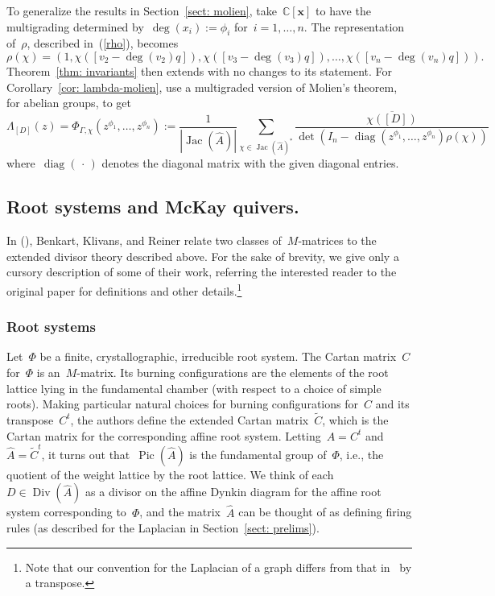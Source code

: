 \documentclass{amsart}
\DeclareMathOperator{\Pic}{Pic}
\DeclareMathOperator{\Jac}{Jac}
\DeclareMathOperator{\Div}{Div}
\DeclareMathOperator{\diag}{diag}
\newcommand{\C}{\mathbb{C}}
\newcommand{\wA}{\widehat{A}}
\newcommand{\polyring}{\C[\mathbf{x}]}
\begin{document}
  To generalize the results in
Section~\ref{sect: molien}, take~$\polyring$ to have the multigrading determined
by~$\deg(x_i):=\phi_i$ for~$i=1,\dots,n$.  The representation of~$\rho$, described
in~(\ref{rho}), becomes
\begin{equation}\label{eqn: new rho}
  \rho(\chi)=(1,\chi([v_2-\deg(v_2)q]),\chi([v_3-\deg(v_3)q]),\dots,\chi([v_n-\deg(v_n)q])).
\end{equation}
Theorem~\ref{thm: invariants} then extends with no changes to its statement.  For
Corollary~\ref{cor: lambda-molien}, use a multigraded version of Molien's theorem,
for abelian groups, to get
\begin{equation}\label{eqn: new lambda_molien}
  \Lambda_{[D]}(z)=
\Phi_{\Gamma,\chi}(z^{\phi_1},\dots,z^{\phi_n})
:=\frac{1}{|\Jac(\wA)|}\sum_{\chi\in\Jac(\wA)^*}\frac{\overline{\chi([D])}}{\det(I_n-\diag(z^{\phi_1},\dots,z^{\phi_n})\rho(\chi))}
\end{equation}
where~$\diag(\,\cdot\,)$ denotes the diagonal matrix with the given diagonal entries.

\subsection{Root systems and McKay quivers.}\label{sect: roots and McKay}  
In (\cite{BKR}), Benkart, Klivans, and Reiner
relate two classes of~$M$-matrices to the extended divisor theory described
above.  For the sake of brevity, we give only a cursory description of some of
their work, referring the interested reader to the original paper for definitions and
other details.\footnote{Note that our convention for the Laplacian of a graph differs
from that in~\cite{BKR} by a transpose.}
\smallskip

\subsubsection{Root systems}\label{sect: roots}  Let~$\Phi$ be a finite,
crystallographic, irreducible root system. The Cartan matrix~$C$ for~$\Phi$ is
an~$M$-matrix. Its burning configurations are the elements of the root lattice
lying in the fundamental chamber (with respect to a choice of simple roots).
Making particular natural choices for burning configurations for~$C$ and its
transpose~$C^t$, the authors define the extended Cartan matrix~$\widetilde{C}$,
which is the Cartan matrix for the corresponding affine root system.
Letting~$A=C^t$ and~$\wA=\widetilde{C}^t$, it turns out that~$\Pic(\wA)$ is the
fundamental group of~$\Phi$, i.e., the quotient of the weight lattice by the
root lattice.  We think of each~$D\in\Div(\wA)$ as a divisor on the affine
Dynkin diagram for the affine root system corresponding to~$\Phi$, and the
matrix~$\wA$ can be thought of as defining firing rules (as described for the
Laplacian in Section~\ref{sect: prelims}).
\end{document}
